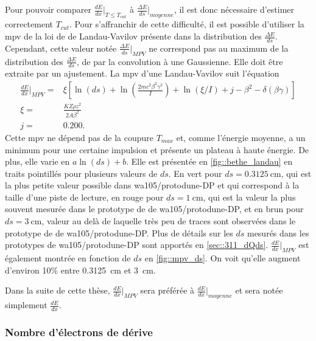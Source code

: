         Pour pouvoir comparer $\frac{dE}{dx}\rvert_{T\leq T_{cut}}$ à $\frac{\Delta E}{ds}\rvert_{moyenne}$, il est donc nécessaire d'estimer correctement $T_{cut}$. Pour s'affranchir de cette difficulté, il est possible d'utiliser la \gls{mpv} de la loi de de Landau-Vavilov présente dans la distribution des $\frac{\Delta E}{ds}$. Cependant, cette valeur notée $\frac{\Delta E}{ds}\rvert_{MPV}$ ne correspond pas au maximum de la distribution des $\frac{\Delta E}{ds}$, de par la convolution à une Gaussienne. Elle doit être extraite par un ajustement. La \gls{mpv} d'une Landau-Vavilov suit l'équation\cite{pdg2018}
        \begin{eqnarray}
          \frac{dE}{dx}\biggr\rvert_{MPV} = & \xi\left[\ln(ds) + \ln\left(\frac{2mc^2\beta^2\gamma^2}{I}\right)+\ln(\xi/I)+j-\beta^2 - \delta(\beta\gamma)\right] \label{eq::mpv} \\
          \xi = & \frac{KZ\rho z^2}{2A\beta^2}\nonumber\\
          j = & 0.200.\nonumber
        \end{eqnarray}
        Cette \gls{mpv} ne dépend pas de la coupure $T_{max}$ et, comme l'énergie moyenne, a un minimum pour une certaine impulsion et présente un plateau à haute énergie. De plus, elle varie en $a\ln(ds)+b$. Elle est présentée en \autoref{fig::bethe_landau} en traits pointillés pour plusieurs valeurs de $ds$. En vert pour $ds=\SI{0.3125}{\centi\meter}$, qui est la plus petite valeur possible dans \gls{wa105}/proto\gls{dune}-DP et qui correspond à la taille d'une piste de lecture, en rouge pour $ds=\SI{1}{\centi\meter}$, qui est la valeur la plus souvent mesurée dans le prototype de \TOO de \gls{wa105}/proto\gls{dune}-DP, et en brun pour $ds=\SI{3}{\centi\meter}$, valeur au delà de laquelle très peu de traces sont observées dans le prototype de \TOO de \gls{wa105}/proto\gls{dune}-DP. Plus de détails sur les $ds$ mesurés dans les prototypes de \gls{wa105}/proto\gls{dune}-DP sont apportés en \autoref{sec::311_dQds}. $\frac{dE}{dx}\rvert_{MPV}$ est également montrée en fonction de $ds$ en \autoref{fig::mpv_ds}. On voit qu'elle augment d'environ 10\;\% entre \SI{0.3125}{\centi\meter} et \SI{3}{\centi\meter}.

        Dans la suite de cette thèse, $\frac{dE}{dx}\rvert_{MPV}$ sera préférée à $\frac{dE}{dx}\rvert_{moyenne}$ et sera notée simplement $\frac{dE}{dx}$.

      \subsubsection{Nombre d'électrons de dérive}

